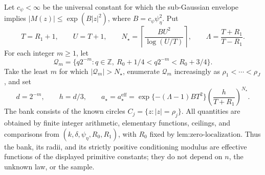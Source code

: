 Let \(c_{\psi}<\infty\) be the universal constant for which the sub-Gaussian envelope implies \(|M(z)|\le \exp(B|z|^2)\), where \(B=c_{\psi}\psi_{\eta}^2\).  Put
\[
 T=R_1+1,\qquad U=T+1,\qquad
 N_{\star}=\left\lceil\frac{BU^2}{\log(U/T)}\right\rceil,
 \qquad \Lambda=\frac{T+R_1}{T-R_1}.
\]
For each integer \(m\ge1\), let
\[
 \mathcal Q_m=\{q2^{-m}:q\in\mathbb Z,\ R_0+1/4<q2^{-m}<R_0+3/4\}.
\]
Take the least \(m\) for which \(|\mathcal Q_m|>N_{\star}\), enumerate \(\mathcal Q_m\) increasingly as \(\rho_1<\cdots<\rho_J\), and set
\[
 d=2^{-m},\qquad h=d/3,\qquad
 a_{\star}=a_{\star}^{\mathrm{eff}}
 =\exp\{-(\Lambda-1)BT^2\}
 \left(\frac{h}{T+R_1}\right)^{N_{\star}}.
\]
The bank consists of the known circles \(C_j=\{z:|z|=\rho_j\}\).  All quantities are obtained by finite integer arithmetic, elementary functions, ceilings, and comparisons from \((k,\delta,\psi_{\eta},R_0,R_1)\), with \(R_0\) fixed by \(\text{lem:zero-localization}\).  Thus the bank, its radii, and its strictly positive conditioning modulus are effective functions of the displayed primitive constants; they do not depend on \(n\), the unknown law, or the sample.